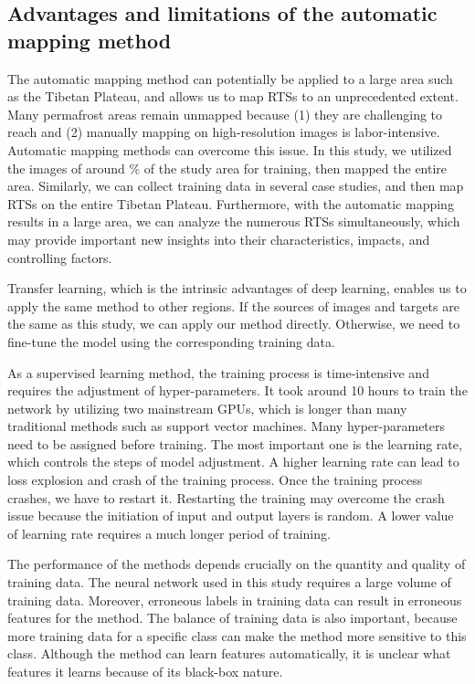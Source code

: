 \documentclass[authoryear,preprint,review,12pt]{elsarticle}
\begin{document}
\subsection{Advantages and limitations of the automatic mapping method}
\label{subsec_advantage_limitation_method}

The automatic mapping method can potentially be applied to a large area such as the Tibetan Plateau, and allows us to map RTSs to an unprecedented extent. Many permafrost areas remain unmapped because (1) they are challenging to reach and (2) manually mapping on high-resolution images is labor-intensive. Automatic mapping methods can overcome this issue. In this study, we utilized the images of around \% of the study area for training, then mapped the entire area. Similarly, we can collect training data in several case studies, and then map RTSs on the entire Tibetan Plateau. Furthermore, with the automatic mapping results in a large area, we can analyze the numerous RTSs simultaneously, which may provide important new insights into their characteristics, impacts, and controlling factors.  

Transfer learning, which is the intrinsic advantages of deep learning, enables us to apply the same method to other regions. If the sources of images and targets are the same as this study, we can apply our method directly. Otherwise, we need to fine-tune the model using the corresponding training data. 

As a supervised learning method, the training process is time-intensive and requires the adjustment of hyper-parameters. It took around 10 hours to train the network by utilizing two mainstream GPUs, which is longer than many traditional methods such as support vector machines. Many hyper-parameters need to be assigned before training. The most important one is the learning rate, which controls the steps of model adjustment. A higher learning rate can lead to loss explosion and crash of the training process. Once the training process crashes, we have to restart it. Restarting the training may overcome the crash issue because the initiation of input and output layers is random. A lower value of learning rate requires a much longer period of training. 

The performance of the methods depends crucially on the quantity and quality of training data. The neural network used in this study requires a large volume of training data. Moreover, erroneous labels in training data can result in erroneous  features for the method. The balance of training data is also important, because more training data for a specific class can make the method more sensitive to this class. Although the method can learn features automatically, it is unclear what features it learns because of its black-box nature. 
\end{document}
